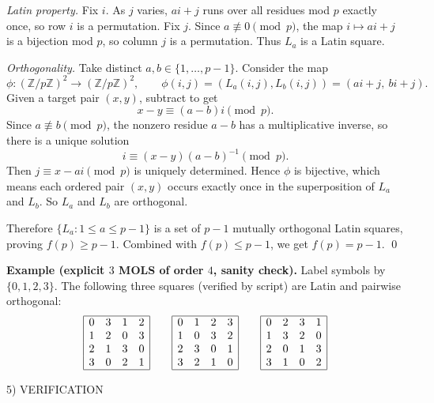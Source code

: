 \emph{Latin property.}
Fix $i$. As $j$ varies, $ai+j$ runs over all residues mod $p$ exactly once, so row $i$ is a permutation.
Fix $j$. Since $a\not\equiv 0\pmod p$, the map $i\mapsto ai+j$ is a bijection mod $p$, so column $j$ is a permutation.
Thus $L_a$ is a Latin square.

\emph{Orthogonality.}
Take distinct $a,b\in\{1,\dots,p-1\}$. Consider the map
\[
\phi: (\mathbb Z/p\mathbb Z)^2 \to (\mathbb Z/p\mathbb Z)^2,\qquad \phi(i,j)=(L_a(i,j),L_b(i,j))=(ai+j,\ bi+j).
\]
Given a target pair $(x,y)$, subtract to get
\[
 x-y \equiv (a-b)i \pmod p.
\]
Since $a\not\equiv b\pmod p$, the nonzero residue $a-b$ has a multiplicative inverse, so there is a unique solution
\[
 i \equiv (x-y)(a-b)^{-1} \pmod p.
\]
Then $j\equiv x-ai\pmod p$ is uniquely determined.
Hence $\phi$ is bijective, which means each ordered pair $(x,y)$ occurs exactly once in the superposition of $L_a$ and $L_b$.
So $L_a$ and $L_b$ are orthogonal.

Therefore $\{L_a:1\le a\le p-1\}$ is a set of $p-1$ mutually orthogonal Latin squares, proving $f(p)\ge p-1$.
Combined with $f(p)\le p-1$, we get $f(p)=p-1$.
\qed

\medskip

\textbf{Example (explicit $3$ MOLS of order $4$, sanity check).}
Label symbols by $\{0,1,2,3\}$. The following three squares (verified by script) are Latin and pairwise orthogonal:
\[
\begin{array}{c}
\begin{array}{|cccc|}\hline
0&3&1&2\\
1&2&0&3\\
2&1&3&0\\
3&0&2&1\\\hline
\end{array}
\qquad
\begin{array}{|cccc|}\hline
0&1&2&3\\
1&0&3&2\\
2&3&0&1\\
3&2&1&0\\\hline
\end{array}
\qquad
\begin{array}{|cccc|}\hline
0&2&3&1\\
1&3&2&0\\
2&0&1&3\\
3&1&0&2\\\hline
\end{array}
\end{array}
\]

5) VERIFICATION

